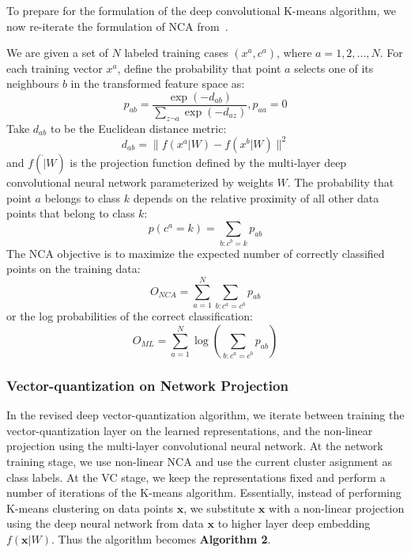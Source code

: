 \documentclass{article}
\begin{document}
To prepare for the formulation of the deep convolutional K-means 
algorithm, we now re-iterate the formulation of NCA 
from~\cite{roweis17neighbourhood}. 

We are given a set of $N$ labeled training cases $(x^a, c^a)$, where 
$a = 1, 2, ..., N$. For each training vector $x^a$, define the 
probability that point $a$ selects one of its neighbours $b$ in the 
transformed feature space as: 
\begin{equation} 
\label{nca_softmax}
p_{ab} = \frac{\exp(-d_{ab})}{\sum_{z\neg a} \exp(-d_{az})}, p_{aa} =0 
\end{equation} 
Take $d_{ab}$ to be the Euclidean distance metric: 
\begin{equation} 
\label{nca_distance}
d_{ab} = \| f(x^a|W) - f(x^b|W) \|^2 
\end{equation} 
and $f(\dot|W)$ is the projection function defined by the multi-layer
deep convolutional neural network parameterized by weights $W$. The
probability that point $a$ belongs to class $k$ depends on the
relative proximity of all other data points that belong to class $k$: 
\begin{equation} 
p(c^a = k) = \sum_{b:c^b=k} p_{ab} 
\end{equation} 
The NCA objective is to maximize the expected number of correctly
classified points on the training data: 
\begin{equation}
O_{NCA} = \sum_{a=1}^N\sum_{b:c^a=c^b}p_{ab}
\end{equation}
or the log probabilities of the correct classification: 
\begin{equation}
O_{ML} = \sum_{a=1}^N\log(\sum_{b:c^a=c^b}p_{ab})
\end{equation} 

\subsubsection{Vector-quantization on Network Projection} 
\label{kmeans_net_projection} 
In the revised deep vector-quantization algorithm, we iterate between
training the vector-quantization layer on the learned representations,
and the non-linear projection using the multi-layer convolutional
neural network. At the network training stage, we use non-linear NCA
and use the current cluster asignment as class labels. At the VC
stage, we keep the representations fixed and perform a number of
iterations of the K-means algorithm. Essentially, instead of
performing K-means clustering on data points $\mathbf{x}$, we
substitute $\mathbf{x}$ with a non-linear projection using the deep
neural network from data $\mathbf{x}$ to higher layer deep embedding
$f(\mathbf{x}|W)$. Thus the algorithm becomes \textbf{Algorithm 2}. 
\end{document}
